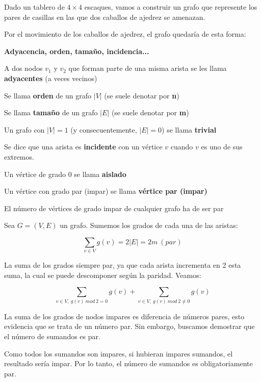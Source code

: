 \documentclass[openany]{book}
\begin{document}
\begin{example}
  Dado un tablero de $4 \times 4$ escaques, vamos a construir un grafo que represente los pares de casillas en las que dos caballos de ajedrez se amenazan.

  Por el movimiento de los caballos de ajedrez, el grafo quedaría de esta forma:

\end{example}

\begin{definition}
  { \color{turquoise} \textbf{Adyacencia, orden, tamaño, incidencia...}}

  A dos nodos $ v_1 $ y $ v_2 $ que forman parte de una misma arista se les llama \textbf{adyacentes} (a veces vecinos)

  Se llama \textbf{orden} de un grafo $ |V|  $ (se suele denotar por \textbf{n})

  Se llama \textbf{tamaño} de un grafo $ |E|  $ (se suele denotar por \textbf{m})

  Un grafo con $|V| =1$ (y consecuentemente, $|E| =0$) se llama \textbf{trivial}

  Se dice que una arista es \textbf{incidente} con un vértice $ v $ cuando $ v $ es uno de sus extremos.

  Un vértice de grado 0 se llama \textbf{aislado}

  Un vértice con grado par (impar) se llama \textbf{vértice par (impar)}
\end{definition}













\begin{proposition}
  El número de vértices de grado impar de cualquier grafo ha de ser par
\end{proposition}

\begin{demonstration}
  Sea $G=(V, E)$ un grafo. Sumemos los grados de cada una de las aristas:

  $$ \sum_{v \in V}g(v)= 2|E|=2m\ (par) $$

  La suma de los grados siempre par, ya que cada arista incrementa en 2 esta suma, la cual se puede descomponer según la paridad. Veamos:

  $$ \sum_{v \in V, \ g(v)\ mod\ 2=0}g(v) + \sum_{v \in V, \ g(v)\ mod\ 2 \ne 0} g(v) $$

  La suma de los grados de nodos impares es diferencia de números pares, esto evidencia que se trata de un número par. Sin embargo, buscamos demostrar que el número de sumandos es par.

  Como todos los sumandos son impares, si hubieran impares sumandos, el resultado sería impar. Por lo tanto, el número de sumandos es obligatoriamente par.

\end{demonstration}
\end{document}
